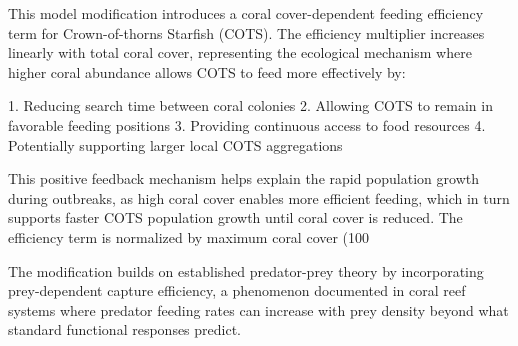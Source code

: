 This model modification introduces a coral cover-dependent feeding efficiency term for Crown-of-thorns Starfish (COTS). The efficiency multiplier increases linearly with total coral cover, representing the ecological mechanism where higher coral abundance allows COTS to feed more effectively by:

1. Reducing search time between coral colonies
2. Allowing COTS to remain in favorable feeding positions
3. Providing continuous access to food resources
4. Potentially supporting larger local COTS aggregations

This positive feedback mechanism helps explain the rapid population growth during outbreaks, as high coral cover enables more efficient feeding, which in turn supports faster COTS population growth until coral cover is reduced. The efficiency term is normalized by maximum coral cover (100%

The modification builds on established predator-prey theory by incorporating prey-dependent capture efficiency, a phenomenon documented in coral reef systems where predator feeding rates can increase with prey density beyond what standard functional responses predict.
